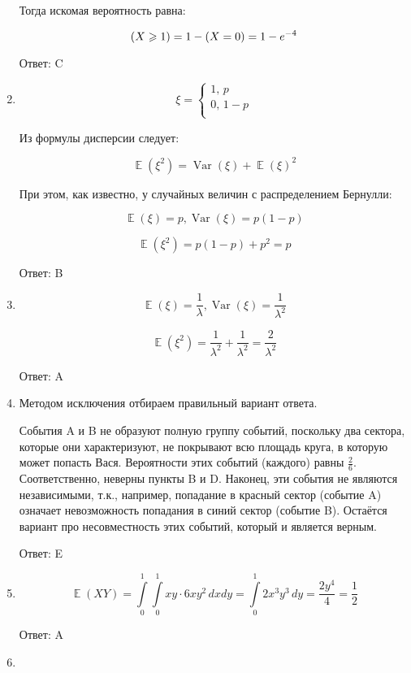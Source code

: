 \documentclass[11pt, a4paper]{article}
\DeclareMathOperator{\Var}{Var}
\DeclareMathOperator{\E}{\mathbb{E}}
\let\P\relax
\DeclareMathOperator{\P}{\mathbb{P}}
\theoremstyle{definition}
\begin{document}
\begin{enumerate}
	Тогда искомая вероятность равна:
	
	\[
	\P(X\geqslant 1)=1-\P(X=0)=1-e^{-4}
	\]
	
	Ответ: C
	
	\item 
	
	\[
	\xi=\begin{cases}
	1 ,\, p\\
	0, \, 1-p\\
	\end{cases}
	\]
	
	Из формулы дисперсии следует:
	
	\[
	\E(\xi^2)=\Var(\xi)+\E(\xi)^2
	\]
	
	При этом, как известно, у случайных величин с распределением Бернулли:
	
	\[
	\E(\xi)=p, \Var(\xi)=p(1-p)
	\]
	
	\[
	\E(\xi^2)=p(1-p)+p^2=p
	\]
	
	Ответ: B
	
	\item 
	
	\[
	\E(\xi)=\frac{1}{\lambda}, \Var(\xi)=\frac{1}{\lambda^2}
	\]
	
	\[
	\E(\xi^2)=\frac{1}{\lambda^2}+\frac{1}{\lambda^2}=\frac{2}{\lambda^2}
	\]
	
	Ответ: A
	
	\item 
	
	Методом исключения отбираем правильный вариант ответа. 
	
	События A и B не образуют полную группу событий, поскольку два сектора, которые они характеризуют, не покрывают всю площадь круга, в которую может попасть Вася.
	Вероятности этих событий (каждого) равны $\frac{2}{6}$. 
	Соответственно, неверны пункты B и D. 
	Наконец, эти события не являются независимыми, т.к., например, попадание в красный сектор (событие A) означает невозможность попадания в синий сектор (событие B).
	Остаётся вариант про несовместность этих событий, который и является верным.
	
	Ответ: E
	
	\item 
	
	\[
	\E(XY)=\int\limits_{0}^{1}\int\limits_{0}^{1} xy\cdot 6xy^2\,dxdy=\int\limits_{0}^{1} 2x^3y^3\,dy=\frac{2y^4}{4}=\frac{1}{2}
	\]
	
	Ответ: A	
	
	\item 
	

\end{enumerate}
\end{document}
